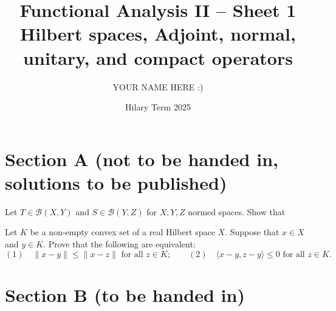 \documentclass[answers]{exam}
\title{Functional Analysis II -- Sheet 1\\Hilbert spaces, Adjoint, normal, unitary, and compact operators}
\author{YOUR NAME HERE :)}
\date{Hilary Term 2025}
\begin{document}
\maketitle

\section*{Section A \large(not to be handed in, solutions to be published)}

\begin{questions}

\question%
Let $T \in \mathcal{B}(X, Y)$ and $S \in \mathcal{B}(Y, Z)$ for $X, Y, Z$ normed spaces. Show that



\question%
Let $K$ be a non-empty convex set of a real Hilbert space $X$. Suppose that $x \in X$ and $y \in K$. Prove that the following are equivalent: \[
	(1)\quad\|x-y\| \leqslant\|x-z\| \text{ for all } z \in K;\qquad
	(2)\quad\langle x-y, z-y\rangle \leqslant 0 \text{ for all } z \in K.
\]

\end{questions}



\section*{Section B \large(to be handed in)}
\end{document}
